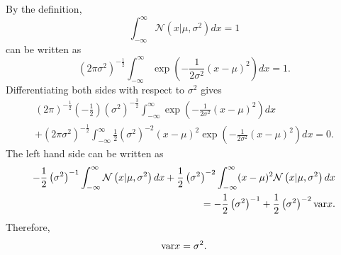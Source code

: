 By the definition,  
%
\begin{equation}
\int_{- \infty}^{\infty} \mathcal{N} \left( x | \mu, \sigma ^ 2 \right) dx = 1
\end{equation}
%
can be written as
%
\begin{equation}
\left( 2 \pi \sigma ^ 2 \right) ^ {-\frac{1}{2}} \int_{-\infty}^{\infty} \exp \left( - \frac{1}{2 \sigma ^ 2} (x - \mu) ^ 2 \right) dx = 1.
\end{equation}
%
Differentiating both sides with respect to $\sigma ^ 2$ gives 
%
\begin{equation}
\begin{aligned}
\left( 2 \pi \right) ^ {-\frac{1}{2}} \left( - \frac{1}{2} \right) \left( \sigma ^ 2 \right) ^ {- \frac{3}{2}} \int_{-\infty}^{\infty} \exp \left( -\frac{1}{2 \sigma ^ 2} (x - \mu) ^ 2 \right) dx \\
+ \left( 2 \pi \sigma ^ 2 \right) ^ {-\frac{1}{2}} \int_{-\infty}^{\infty} \frac{1}{2} \left( \sigma ^ 2 \right) ^ {- 2} (x - \mu) ^ 2 \exp \left( - \frac{1}{2 \sigma ^ 2} (x - \mu) ^ 2 \right) dx = 0.
\end{aligned}
\end{equation}
%
The left hand side can be written as
%
\begin{equation}
\begin{aligned}
- \frac{1}{2} \left( \sigma ^ 2 \right) ^ {- 1} \int_{- \infty}^{\infty} \mathcal{N} \left( x | \mu, \sigma ^ 2 \right) dx + \frac{1}{2} \left( \sigma ^ 2 \right) ^ {- 2} \int_{- \infty} ^ {\infty} (x - \mu) ^ 2 \mathcal{N} \left( x | \mu, \sigma ^ 2 \right) dx \\
= - \frac{1}{2} \left( \sigma ^ 2 \right) ^ {- 1} + \frac{1}{2} \left( \sigma ^ 2 \right) ^ {- 2} {\rm var} x.
\end{aligned}
\end{equation}
%
Therefore,
%
\begin{equation}
{\rm var} x = \sigma ^ 2.
\end{equation}
%


